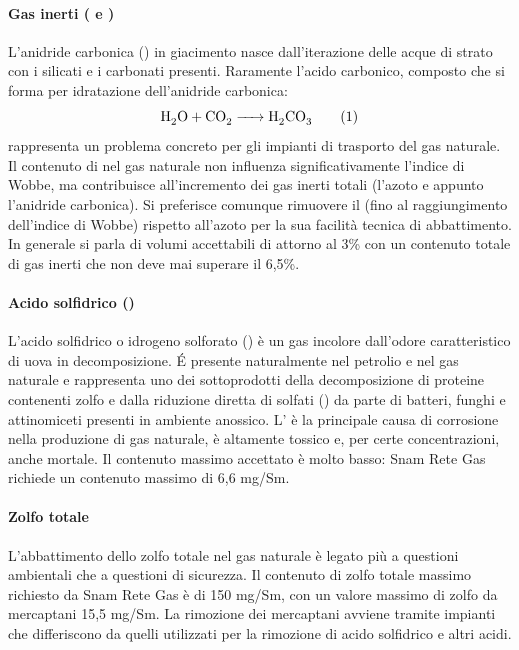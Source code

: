\paragraph{Gas inerti ( e )}
L'anidride carbonica () in giacimento nasce dall'iterazione delle acque di strato con i silicati e i carbonati presenti. Raramente l'acido carbonico, composto che si forma per idratazione dell'anidride carbonica: 
\[\ce{H2O + CO2 -> H2CO3} \addtag \label{eq:acidocarbonico}\]
rappresenta un problema concreto per gli impianti di trasporto del gas naturale. Il contenuto di  nel gas naturale non influenza significativamente l'indice di Wobbe, ma contribuisce all'incremento dei gas inerti totali (l'azoto  e appunto l'anidride carbonica). Si preferisce comunque rimuovere il  (fino al raggiungimento dell'indice di Wobbe) rispetto all'azoto per la sua facilità tecnica di abbattimento. In generale si parla di volumi accettabili di  attorno al 3\% con un contenuto totale di gas inerti che non deve mai superare il 6,5\%.

\paragraph{Acido solfidrico ()}
L'acido solfidrico o idrogeno solforato () è un gas incolore dall'odore caratteristico di uova in decomposizione. \'E presente naturalmente nel petrolio e nel gas naturale e rappresenta uno dei sottoprodotti della decomposizione di proteine contenenti zolfo e dalla riduzione diretta di solfati () da parte di batteri, funghi e attinomiceti presenti in ambiente anossico. L' è la principale causa di corrosione nella produzione di gas naturale, è altamente tossico e, per certe concentrazioni, anche mortale. Il contenuto massimo accettato è molto basso: Snam Rete Gas richiede un contenuto massimo di 6,6 mg/Sm.

\paragraph{Zolfo totale}
L'abbattimento dello zolfo totale nel gas naturale è legato più a questioni ambientali che a questioni di sicurezza. Il contenuto di zolfo totale massimo richiesto da Snam Rete Gas è di 150 mg/Sm, con un valore massimo di zolfo da mercaptani 15,5 mg/Sm. La rimozione dei mercaptani avviene tramite impianti che differiscono da quelli utilizzati per la rimozione di acido solfidrico e altri acidi.

